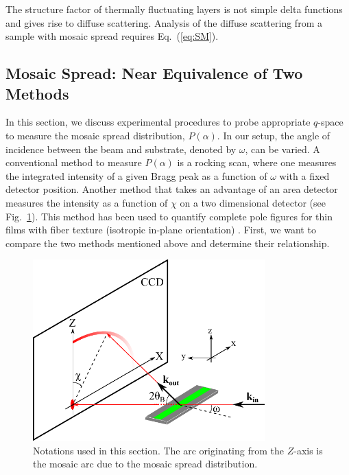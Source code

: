 The structure factor of thermally fluctuating layers is not simple delta functions
and gives rise to diffuse scattering. Analysis of the diffuse scattering 
from a sample with mosaic spread requires Eq.~(\ref{eq:SM}).

\subsection{Mosaic Spread: Near Equivalence of Two Methods}\label{app:mosaic_exp}
In this section, we discuss experimental procedures to probe appropriate 
$q$-space
to measure the mosaic spread distribution, $P(\alpha)$. In our setup, the angle of 
incidence between the beam and substrate, denoted by $\omega$, can be varied. A 
conventional method to measure $P(\alpha)$ is a rocking scan, where
one measures the integrated intensity of a given Bragg peak as a function of 
$\omega$ with a fixed detector position. Another method that takes an advantage
of an area detector \cite{Rodriguez-Navarro07} 
measures the intensity as a function of $\chi$ on a two
dimensional detector (see Fig.~\ref{fig:ring_setup}). This method has been used
to quantify complete pole figures for thin films with fiber texture (isotropic 
in-plane orientation) \cite{Baker10}.
First, we want to compare the two methods mentioned 
above and determine their relationship.

\begin{figure}
  \centering
  \includegraphics[width=0.8\textwidth]{figures/ripple/mosaic/ring_setup}
  \caption[Notations used in this section]
  {Notations used in this section. The arc originating from the $Z$-axis
  is the mosaic arc due to the mosaic spread distribution.}
  \label{fig:ring_setup}
\end{figure}


